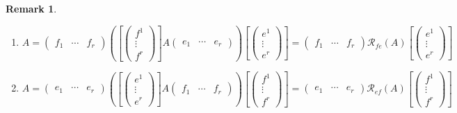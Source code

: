 \documentclass[aps,preprint]{revtex4}
\newtheorem{remark}[theorem]{Remark}
\begin{document}
\begin{remark}
\begin{enumerate}
\item 
\begin{equation}
A=\left( 
\begin{array}{ccc}
f_{1} & \cdots & f_{r}%
\end{array}%
\right) \left( \left[ \left( 
\begin{array}{c}
f^{1} \\ 
\vdots \\ 
f^{r}%
\end{array}%
\right) \right] A\left( 
\begin{array}{ccc}
e_{1} & \cdots & e_{r}%
\end{array}%
\right) \right) \left[ \left( 
\begin{array}{c}
e^{1} \\ 
\vdots \\ 
e^{r}%
\end{array}%
\right) \right] =\left( 
\begin{array}{ccc}
f_{1} & \cdots & f_{r}%
\end{array}%
\right) \mathcal{R}_{fe}\left( A\right) \left[ \left( 
\begin{array}{c}
e^{1} \\ 
\vdots \\ 
e^{r}%
\end{array}%
\right) \right]
\end{equation}

\item 
\begin{equation}
A=\left( 
\begin{array}{ccc}
e_{1} & \cdots & e_{r}%
\end{array}%
\right) \left( \left[ \left( 
\begin{array}{c}
e^{1} \\ 
\vdots \\ 
e^{r}%
\end{array}%
\right) \right] A\left( 
\begin{array}{ccc}
f_{1} & \cdots & f_{r}%
\end{array}%
\right) \right) \left[ \left( 
\begin{array}{c}
f^{1} \\ 
\vdots \\ 
f^{r}%
\end{array}%
\right) \right] =\left( 
\begin{array}{ccc}
e_{1} & \cdots & e_{r}%
\end{array}%
\right) \mathcal{R}_{ef}\left( A\right) \left[ \left( 
\begin{array}{c}
f^{1} \\ 
\vdots \\ 
f^{r}%
\end{array}%
\right) \right]
\end{equation}
\end{enumerate}
\end{remark}
\end{document}
